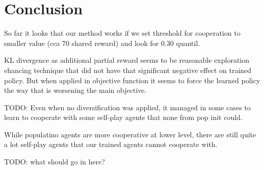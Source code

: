 \chapter*{Conclusion}
So far it looks that our method works if we set threshold for cooperation to smaller value (cca 70 shared reward) and look for 0.30 quantil.

KL divergence as additional partial reward seems to be reasonable exploration ehancing technique that did not have that significant negative effect on trained policy.
But when applied in objective function it seems to force the learned policy the way that is worsening the main objective.

TODO: Even when no diversification was applied, it managed in some cases to learn to cooperate with some self-play agents that none from pop init could.

While populatino agents are more cooperative at lower level, there are still quite a lot self-play agents that our trained agents cannot cooperate with.


{\color{blue}TODO: what should go in here?}

